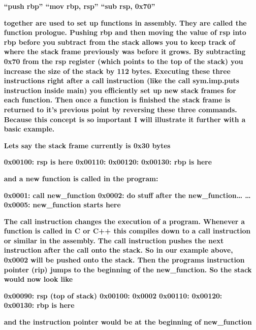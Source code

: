 \documentclass[letterpaper]{article}
\begin{document}
\textbf{{}``push rbp''\newline
{}``mov rbp, rsp''\newline
{}``sub rsp, 0x70''}

\textbf{together are used to set up functions in assembly. They are called the function prologue. Pushing rbp and then
moving the value of rsp into rbp before you subtract from the stack allows you to keep track of where the stack frame
previously was before it grows. By subtracting 0x70 from the rsp register (which points to the top of the stack) you
increase the size of the stack by 112 bytes. Executing these three instructions right after a call instruction (like
the call sym.imp.puts instruction inside main) you efficiently set up new stack frames for each function. Then once a
function is finished the stack frame is returned to it's previous point by reversing these three commands. Because this
concept is so important I will illustrate it further with a basic example.}

\textbf{Lets say the stack frame currently is 0x30 bytes}

\textbf{0x00100: rsp is here\newline
0x00110:\newline
0x00120:\newline
0x00130: rbp is here}

\textbf{and a new function is called in the program:}

\textbf{0x0001: call new\_function\newline
0x0002: do stuff after the new\_function{\dots}\newline
{\dots} 0x0005: new\_function starts here}

\textbf{The call instruction changes the execution of a program. Whenever a function is called in C or C++ this compiles
down to a call instruction or similar in the assembly. The call instruction pushes the next instruction after the call
onto the stack. So in our example above, 0x0002 will be pushed onto the stack. Then the programs instruction pointer
(rip) jumps to the beginning of the new\_function. So the stack would now look like}

\textbf{0x00090: rsp (top of stack)\newline
0x00100: 0x0002\newline
0x00110:\newline
0x00120:\newline
0x00130: rbp is here}

\textbf{and the instruction pointer would be at the beginning of new\_function}
\end{document}
